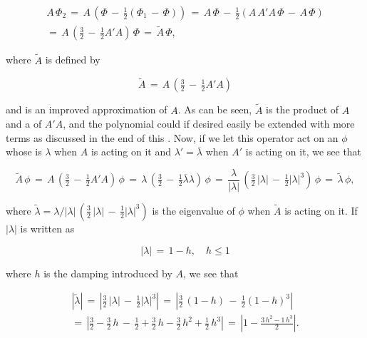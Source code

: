 \begin{equation}
\begin{array}{c}
A\,\Phi_2 \,=\, A\,\left(\Phi \,-\, \tfrac{1}{2}(\Phi_1 \,-\, \Phi)\right) \,=\, A\,\Phi \,-\, \tfrac{1}{2}(A\,A'A\,\Phi \,-\, A\,\Phi) \\
=\, A\,\left(\tfrac{3}{2} \,-\, \tfrac{1}{2}A'A\right)\,\Phi \,=\, \tilde{A}\,\Phi,
\end{array}
\end{equation}

where $\tilde{A}$ is defined by

\begin{equation} \label{eq:compensated_advection_operator}
\tilde{A} \,=\, A\,\left(\tfrac{3}{2} \,-\, \tfrac{1}{2}A'A\right)
\end{equation}
 
and is an improved approximation of $A$. As can be seen, $\tilde{A}$ is the product of $A$ and a \polynomial of $A'A$, and the polynomial could if desired easily be extended with more terms as discussed in the end of this \levelname. Now, if we let this operator act on an \eigenfunction $\phi$ whose \eigenvalue is $\lambda$ when $A$ is acting on it and $\lambda' = \overline{\lambda}$ when $A'$ is acting on it, we see that 

\begin{equation}
\tilde{A}\,\phi \,=\, A\,\left(\tfrac{3}{2} \,-\, \tfrac{1}{2}A'A\right)\,\phi \,=\, \lambda\,\left(\tfrac{3}{2} \,-\, \tfrac{1}{2}\overline{\lambda}\lambda\right)\,\phi \,=\, \frac{\lambda}{|\lambda|}\,\left(\tfrac{3}{2}\,|\lambda| \,-\, \tfrac{1}{2}|\lambda|^3\right)\,\phi \,=\, \tilde{\lambda}\,\phi,
\end{equation}

where $\tilde{\lambda} = \lambda/|\lambda|\,\left(\tfrac{3}{2}\,|\lambda| \,-\, \tfrac{1}{2}|\lambda|^3\right)$ is the eigenvalue of $\phi$ when $\tilde{A}$ is acting on it. If $|\lambda|$ is written as

\begin{equation}
|\lambda| \,=\, 1 - h, \quad h \leq 1
\end{equation}

where $h$ is the damping introduced by $A$, we see that

\begin{equation}
\begin{array}{c}
|\tilde{\lambda}| \,=\, \left|\tfrac{3}{2}\,|\lambda| \,-\, \tfrac{1}{2}|\lambda|^3\right| \,=\, \left|\tfrac{3}{2}\,(1-h) \,-\, \tfrac{1}{2}(1-h)^3\right| \\
=\, \left|\tfrac{3}{2}-\tfrac{3}{2}\,h \,-\, \tfrac{1}{2} + \tfrac{3}{2}\,h - \tfrac{3}{2}\,h^2 + \tfrac{1}{2}\,h^3\right| \,=\, \left|1 - \displaystyle\frac{3\,h^2 - 1\,h^3}{2}\right|.
\end{array}
\end{equation}

